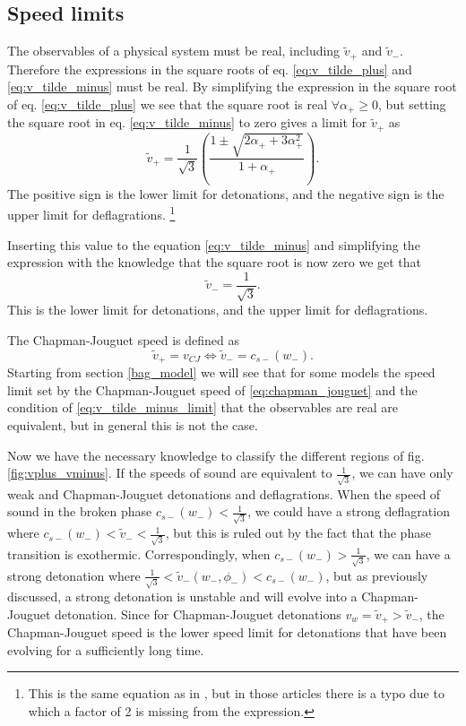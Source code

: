 \clearpage
\FloatBarrier
\subsection{Speed limits}
The observables of a physical system must be real, including $\tilde{v}_+$ and $\tilde{v}_-$.
Therefore the expressions in the square roots of eq. \eqref{eq:v_tilde_plus} and \eqref{eq:v_tilde_minus} must be real.
By simplifying the expression in the square root of eq. \eqref{eq:v_tilde_plus} we see that the square root is real $\forall \alpha_+ \geq 0$,
but setting the square root in eq. \eqref{eq:v_tilde_minus} to zero gives a limit for $\tilde{v}_+$ as
\begin{equation}
\tilde{v}_+ = \frac{1}{\sqrt{3}} \left( \frac{1 \pm \sqrt{2 \alpha_+ + 3 \alpha_+^2}}{1 + \alpha_+} \right).
\label{eq:v_tilde_plus_limit}
\end{equation}
The positive sign is the lower limit for detonations, and the negative sign is the upper limit for deflagrations.%
\footnote{This is the same equation as in \cites[eq. 7.34]{lecture_notes}[eq. B.19]{hindmarsh_gw_pt_2019},
but in those articles there is a typo due to which a factor of 2 is missing from the expression.}

Inserting this value to the equation \eqref{eq:v_tilde_minus} and simplifying the expression with the knowledge that the square root is now zero
we get that
\begin{equation}
\tilde{v}_- = \frac{1}{\sqrt{3}}.
\label{eq:v_tilde_minus_limit}
\end{equation}
This is the lower limit for detonations, and the upper limit for deflagrations.

The Chapman-Jouguet speed is defined as
\begin{equation}
\tilde{v}_+=v_{CJ} \Leftrightarrow \tilde{v}_- = c_{s-}(w_-).
\label{eq:chapman_jouguet}
\end{equation}
Starting from section \eqref{bag_model} we will see that for some models the speed limit set by the Chapman-Jouguet speed of \eqref{eq:chapman_jouguet}
and the condition of \eqref{eq:v_tilde_minus_limit} that the observables are real are equivalent,
but in general this is not the case.

Now we have the necessary knowledge to classify the different regions of fig. \eqref{fig:vplus_vminus}.
If the speeds of sound are equivalent to $\frac{1}{\sqrt{3}}$,
we can have only weak and Chapman-Jouguet detonations and deflagrations.
When the speed of sound in the broken phase $c_{s-}(w_-) < \frac{1}{\sqrt{3}}$,
we could have a strong deflagration where $c_{s-}(w_-) < \tilde{v}_- < \frac{1}{\sqrt{3}}$,
but this is ruled out by the fact that the phase transition is exothermic.
Correspondingly, when $c_{s-}(w_-) > \frac{1}{\sqrt{3}}$,
we can have a strong detonation where $\frac{1}{\sqrt{3}} < \tilde{v}_-(w_-, \phi_-) < c_{s-}(w_-)$,
but as previously discussed, a strong detonation is unstable and will evolve into a Chapman-Jouguet detonation.
Since for Chapman-Jouguet detonations $v_w = \tilde{v}_+ > \tilde{v}_-$,
the Chapman-Jouguet speed is the lower speed limit for detonations that have been evolving for a sufficiently long time.
